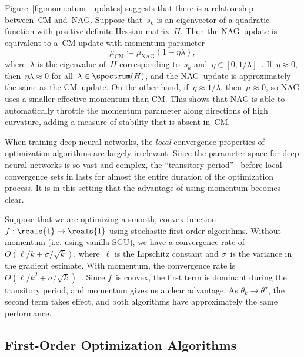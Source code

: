 \documentclass[11pt,a4paper]{article}
\numberwithin{equation}{section}
\begin{document}
Figure~\ref{fig:momentum_updates} suggests that there is a relationship
between~CM and~NAG. Suppose that~$s_k$ is an eigenvector of a quadratic function
with positive-definite Hessian matrix~$H$. Then the NAG~update is equivalent to
a~CM update with momentum parameter
\[
	\mu_{\text{CM}} \coloneqq \mu_{\text{NAG}} (1 - \eta \lambda),
\]
where~$\lambda$ is the eigenvalue of~$H$ corresponding to~$s_k$ and~$\eta \in
[0, 1 / \lambda]$~\citep{sutskever2013importance}. If~$\eta \approx 0$,
then~$\eta \lambda \approx 0$ for all~$\lambda \in \spectrum(H)$, and the
NAG~update is approximately the same as the CM~update. On the other hand,
if~$\eta \approx 1 / \lambda$, then~$\mu \approx 0$, so NAG uses a smaller
effective momentum than CM. This shows that NAG is able to automatically
throttle the momentum parameter along directions of high curvature, adding a
measure of stability that is absent in~CM.

When training deep neural networks, the \emph{local} convergence properties of
optimization algorithms are largely irrelevant. Since the parameter space for
deep neural networks is so vast and complex, the ``transitory
period''~\citep{sutskever2013importance} before local convergence sets in lasts
for almost the entire duration of the optimization process. It is in this
setting that the advantage of using momentum becomes clear.

Suppose that we are optimizing a smooth, convex function~$f : \reals{1} \to
\reals{1}$ using stochastic first-order algorithms. Without momentum (i.e. using
vanilla SGU), we have a convergence rate of~$O(\ell / k + \sigma / \sqrt{k})$,
where~$\ell$ is the Lipschitz constant and $\sigma$~is the variance in the
gradient estimate. With momentum, the convergence rate is~$O(\ell / k^2 + \sigma
/ \sqrt{k})$~\citep{sutskever2013importance}. Since $f$~is convex, the first
term is dominant during the transitory period, and momentum gives us a clear
advantage. As $\theta_k \to \theta^\star$, the second term takes effect, and
both algorithms have approximately the same performance.

\subsection{First-Order Optimization Algorithms}
\end{document}
